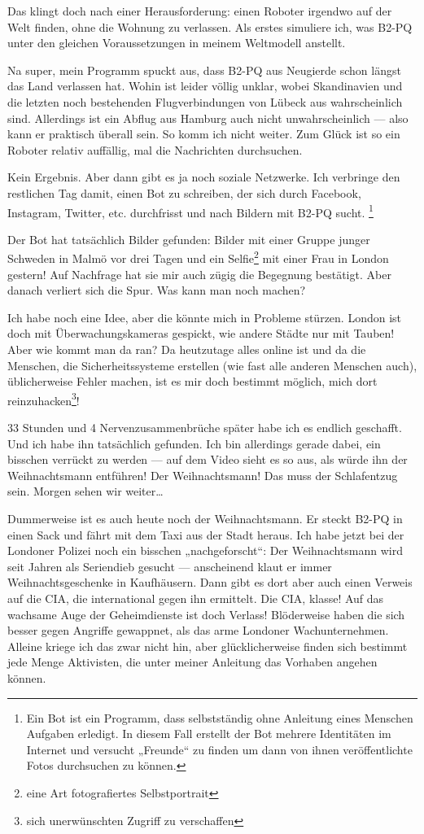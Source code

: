 Das klingt doch nach einer Herausforderung: einen Roboter irgendwo auf der Welt finden, ohne die Wohnung zu verlassen. Als erstes simuliere ich, was B2-PQ unter den gleichen Voraussetzungen in meinem Weltmodell anstellt.

Na super, mein Programm spuckt aus, dass B2-PQ aus Neugierde schon längst das Land verlassen hat. Wohin ist leider völlig unklar, wobei Skandinavien und die letzten noch bestehenden Flugverbindungen von Lübeck aus wahrscheinlich sind. Allerdings ist ein Abflug aus Hamburg auch nicht unwahrscheinlich — also kann er praktisch überall sein. So komm ich nicht weiter. Zum Glück ist so ein Roboter relativ auffällig, mal die Nachrichten durchsuchen.

Kein Ergebnis. Aber dann gibt es ja noch soziale Netzwerke. Ich verbringe den restlichen Tag damit, einen Bot zu schreiben, der sich durch Facebook, Instagram, Twitter, etc. durchfrisst und nach Bildern mit B2-PQ sucht.
\footnote{Ein Bot ist ein Programm, dass selbstständig ohne Anleitung eines Menschen Aufgaben erledigt. In diesem Fall erstellt der Bot mehrere Identitäten im Internet und versucht „Freunde“ zu finden um dann von ihnen veröffentlichte Fotos durchsuchen zu können.}

Der Bot hat tatsächlich Bilder gefunden: Bilder mit einer Gruppe junger Schweden in Malmö vor drei Tagen und ein Selfie\footnote{eine Art fotografiertes Selbstportrait} mit einer Frau in London gestern! Auf Nachfrage hat sie mir auch zügig die Begegnung bestätigt. Aber danach verliert sich die Spur. Was kann man noch machen?

Ich habe noch eine Idee, aber die könnte mich in Probleme stürzen. London ist doch mit Überwachungskameras gespickt, wie andere Städte nur mit Tauben! Aber wie kommt man da ran? Da heutzutage alles online ist und da die Menschen, die Sicherheitssysteme erstellen (wie fast alle anderen Menschen auch), üblicherweise Fehler machen, ist es mir doch bestimmt möglich, mich dort reinzuhacken\footnote{sich unerwünschten Zugriff zu verschaffen}!

33 Stunden und 4 Nervenzusammenbrüche später habe ich es endlich geschafft. Und ich habe ihn tatsächlich gefunden. Ich bin allerdings gerade dabei, ein bisschen verrückt zu werden — auf dem Video sieht es so aus, als würde ihn der Weihnachtsmann entführen! Der Weihnachtsmann! Das muss der Schlafentzug sein. Morgen sehen wir weiter…

Dummerweise ist es auch heute noch der Weihnachtsmann. Er steckt B2-PQ in einen Sack und fährt mit dem Taxi aus der Stadt heraus. Ich habe jetzt bei der Londoner Polizei noch ein bisschen „nachgeforscht“: Der Weihnachtsmann wird seit Jahren als Seriendieb gesucht — anscheinend klaut er immer Weihnachtsgeschenke in Kaufhäusern. Dann gibt es dort aber auch einen Verweis auf die CIA, die international gegen ihn ermittelt. Die CIA, klasse! Auf das wachsame Auge der Geheimdienste ist doch Verlass! Blöderweise haben die sich besser gegen Angriffe gewappnet, als das arme Londoner Wachunternehmen. Alleine kriege ich das zwar nicht hin, aber glücklicherweise finden sich bestimmt jede Menge Aktivisten, die unter meiner Anleitung das Vorhaben angehen können.


